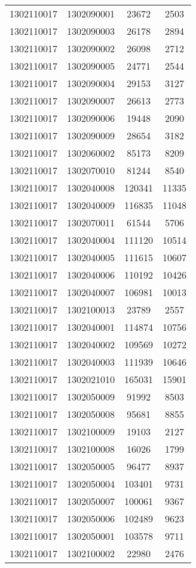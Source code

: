 \begin{longtable}{llcc}
1302110017 & 1302090001 & 23672 & 2503\\
1302110017 & 1302090003 & 26178 & 2894\\
1302110017 & 1302090002 & 26098 & 2712\\
1302110017 & 1302090005 & 24771 & 2544\\
1302110017 & 1302090004 & 29153 & 3127\\
1302110017 & 1302090007 & 26613 & 2773\\
1302110017 & 1302090006 & 19448 & 2090\\
1302110017 & 1302090009 & 28654 & 3182\\
1302110017 & 1302060002 & 85173 & 8209\\
1302110017 & 1302070010 & 81244 & 8540\\
1302110017 & 1302040008 & 120341 & 11335\\
1302110017 & 1302040009 & 116835 & 11048\\
1302110017 & 1302070011 & 61544 & 5706\\
1302110017 & 1302040004 & 111120 & 10514\\
1302110017 & 1302040005 & 111615 & 10607\\
1302110017 & 1302040006 & 110192 & 10426\\
1302110017 & 1302040007 & 106981 & 10013\\
1302110017 & 1302100013 & 23789 & 2557\\
1302110017 & 1302040001 & 114874 & 10756\\
1302110017 & 1302040002 & 109569 & 10272\\
1302110017 & 1302040003 & 111939 & 10646\\
1302110017 & 1302021010 & 165031 & 15901\\
1302110017 & 1302050009 & 91992 & 8503\\
1302110017 & 1302050008 & 95681 & 8855\\
1302110017 & 1302100009 & 19103 & 2127\\
1302110017 & 1302100008 & 16026 & 1799\\
1302110017 & 1302050005 & 96477 & 8937\\
1302110017 & 1302050004 & 103401 & 9731\\
1302110017 & 1302050007 & 100061 & 9367\\
1302110017 & 1302050006 & 102489 & 9623\\
1302110017 & 1302050001 & 103578 & 9711\\
1302110017 & 1302100002 & 22980 & 2476\\

\end{longtable}
